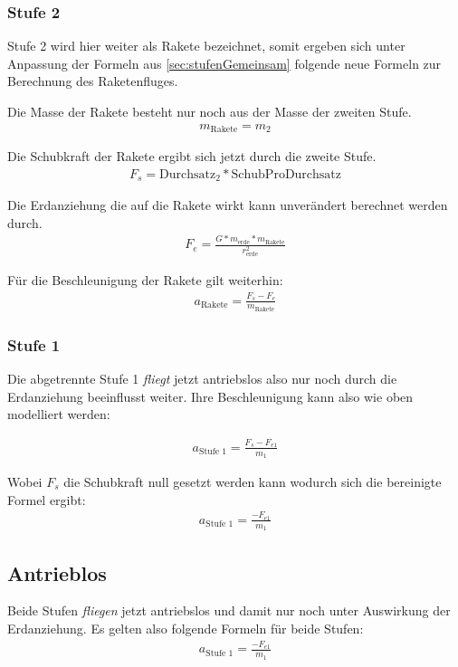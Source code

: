 \documentclass[10pt]{scrartcl}
\begin{document}
	\subsubsection{Stufe 2}
	Stufe 2 wird hier weiter als Rakete bezeichnet, somit ergeben sich unter Anpassung der Formeln aus \ref{sec:stufenGemeinsam} folgende neue Formeln zur Berechnung des Raketenfluges.
	
	Die Masse der Rakete besteht nur noch aus der Masse der zweiten Stufe.
	\begin{align} 
	m_{\text{Rakete}} = m_2
	\end{align}

	Die Schubkraft der Rakete ergibt sich jetzt durch die zweite Stufe.
	\begin{align}
	F_s = \text{Durchsatz}_2 * \text{SchubProDurchsatz}
	\end{align}

	Die Erdanziehung die auf die Rakete wirkt kann unverändert berechnet werden durch.
	\begin{align}
	F_e = \frac{G * m_{\text{erde}} * m_{\text{Rakete}}}{r_{\text{erde}}^2}
	\end{align}
	
	Für die Beschleunigung der Rakete gilt weiterhin:
	\begin{align}
	a_{\text{Rakete}} = \frac{F_s - F_e}{m_{\text{Rakete}}}
	\end{align}	
	
	\subsubsection{Stufe 1}
	Die abgetrennte Stufe 1 \textit{fliegt} jetzt antriebslos also nur noch durch die Erdanziehung beeinflusst weiter.
	Ihre Beschleunigung kann also wie oben modelliert werden: 
	
	\begin{align}
	a_{\text{Stufe 1}} = \frac{F_s - F_{e1}}{m_1}
	\end{align}		
	
	Wobei $F_s$ die Schubkraft null gesetzt werden kann wodurch sich die bereinigte Formel ergibt:
	\begin{align}
	a_{\text{Stufe 1}} = \frac{- F_{e1}}{m_1}
	\end{align}			
	
	
	
	\subsection{Antrieblos}
	Beide Stufen \textit{fliegen} jetzt antriebslos und damit nur noch unter Auswirkung der Erdanziehung.
	Es gelten also folgende Formeln für beide Stufen:
	\begin{align}
	a_{\text{Stufe 1}} = \frac{- F_{e1}}{m_1}
	\end{align}	
	
\end{document}
